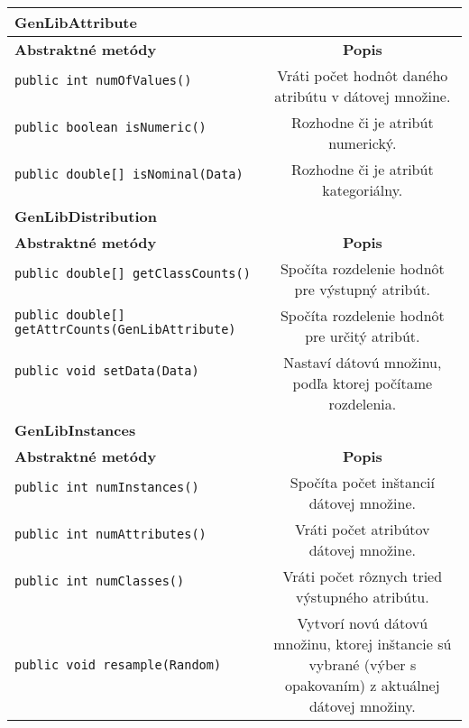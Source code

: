 \begin{table}
\centering
\begin{tabular}{|l|c|}
\hline
\textbf{GenLibAttribute} & \\
\hline\hline
\textbf{Abstraktné metódy} & \textbf{Popis} \\
\hline
\verb|public int numOfValues()| & \multirow{2}{5cm}{Vráti počet hodnôt daného atribútu v dátovej množine.} \\
& \\
\hline
\verb|public boolean isNumeric()| & \multirow{2}{5cm}{Rozhodne či je atribút numerický.} \\
& \\
\hline
\verb|public double[] isNominal(Data)| & \multirow{2}{5cm}{Rozhodne či je atribút kategoriálny.} \\
& \\  
\hline
\hline
\textbf{GenLibDistribution} & \\
\hline\hline
\textbf{Abstraktné metódy} & \textbf{Popis} \\
\hline
\verb|public double[] getClassCounts()| & \multirow{2}{5cm}{Spočíta rozdelenie hodnôt pre výstupný atribút.} \\
& \\
\hline
\verb|public double[] getAttrCounts(GenLibAttribute)| & \multirow{2}{5cm}{Spočíta rozdelenie hodnôt pre určitý atribút.} \\
& \\ 
\hline
\verb|public void setData(Data)| & \multirow{3}{5cm}{Nastaví dátovú množinu, podľa ktorej počítame rozdelenia.} \\
& \\ 
& \\ 
\hline
\hline
\textbf{GenLibInstances} & \\
\hline\hline
\textbf{Abstraktné metódy} & \textbf{Popis} \\
\hline
\verb|public int numInstances()| & \multirow{2}{5cm}{Spočíta počet inštancií dátovej množine.} \\
& \\
\hline
\verb|public int numAttributes()| & \multirow{2}{5cm}{Vráti počet atribútov dátovej množine.} \\
& \\ 
\hline
\verb|public int numClasses()| & \multirow{2}{5cm}{Vráti počet rôznych tried výstupného atribútu.} \\
& \\ 
\hline
\verb|public void resample(Random)| & \multirow{5}{5cm}{Vytvorí novú dátovú množinu, ktorej inštancie sú vybrané (výber s opakovaním) z aktuálnej dátovej množiny.} \\

\end{tabular}
\end{table}
